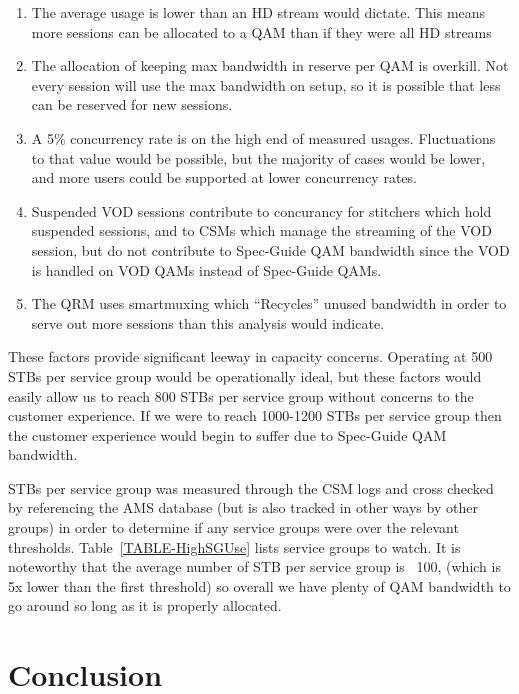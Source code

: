 \documentclass{article}
\begin{document}
\begin{enumerate}
\item The average usage is lower than an HD stream would dictate. This means more sessions can be allocated to a QAM than if they were all HD streams
\item The allocation of keeping max bandwidth in reserve per QAM is overkill. Not every session will use the max bandwidth on setup, so it is possible that less can be reserved for new sessions. 
\item A 5\% concurrency rate is on the high end of measured usages. Fluctuations to that value would be possible, but the majority of cases would be lower, and more users could be supported at lower concurrency rates. 
\item Suspended VOD sessions contribute to concurancy for stitchers which hold suspended sessions, and to CSMs which manage the streaming of the VOD session, but do not contribute to Spec-Guide QAM bandwidth since the VOD is handled on VOD QAMs instead of Spec-Guide QAMs.
\item The QRM uses smartmuxing which ``Recycles'' unused bandwidth in order to serve out more sessions than this analysis would indicate. 
\end{enumerate}
 
These factors provide significant leeway in capacity concerns. Operating at 500 STBs per service group would be operationally ideal, but these factors would easily allow us to reach 800 STBs per service group without concerns to the customer experience. If we were to reach 1000-1200 STBs per service group then the customer experience would begin to suffer due to Spec-Guide QAM bandwidth. 

STBs per service group was measured through the CSM logs and cross checked by referencing the AMS database (but is also tracked in other ways by other groups) in order to determine if any service groups were over the relevant thresholds. Table~\ref{TABLE-HighSGUse} lists service groups to watch. It is noteworthy that the average number of STB per service group is ~100, (which is 5x lower than the first threshold) so overall we have plenty of QAM bandwidth to go around so long as it is properly allocated. 



\section{Conclusion}
\label{SECTION-Conclusion}
\end{document}
